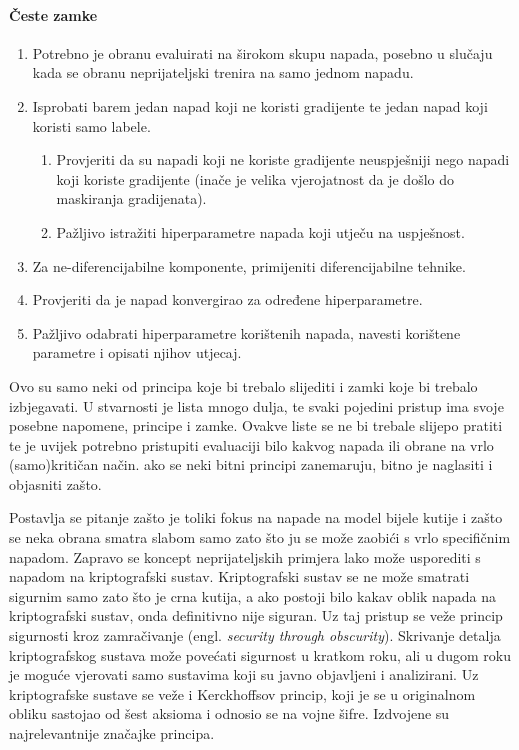 \documentclass[utf8, diplomski]{fer}
\begin{document}
\paragraph{Česte zamke}
\begin{enumerate}[noitemsep,topsep=0pt,parsep=0pt,partopsep=0pt]
	\item Potrebno je obranu evaluirati na širokom skupu napada, posebno u slučaju kada se obranu neprijateljski trenira na samo jednom napadu.
	\item Isprobati barem jedan napad koji ne koristi gradijente te jedan napad koji koristi samo labele.
	\begin{enumerate}[noitemsep,topsep=0pt,parsep=0pt,partopsep=0pt]
    	\item Provjeriti da su napadi koji ne koriste gradijente neuspješniji nego napadi koji koriste gradijente (inače je velika vjerojatnost da je došlo do maskiranja gradijenata).
    	\item Pažljivo istražiti hiperparametre napada koji utječu na uspješnost.
    \end{enumerate}
    \item Za ne-diferencijabilne komponente, primijeniti diferencijabilne tehnike.
    \item Provjeriti da je napad konvergirao za određene hiperparametre.
    \item Pažljivo odabrati hiperparametre korištenih napada, navesti korištene parametre i opisati njihov utjecaj.
\end{enumerate}
\medskip
\par
Ovo su samo neki od principa koje bi trebalo slijediti i zamki koje bi trebalo izbjegavati. U stvarnosti je lista mnogo dulja, te svaki pojedini pristup ima svoje posebne napomene, principe i zamke. Ovakve liste se ne bi trebale slijepo pratiti te je uvijek potrebno pristupiti evaluaciji bilo kakvog napada ili obrane na vrlo (samo)kritičan način. ako se neki bitni principi zanemaruju, bitno je naglasiti i objasniti zašto. 
\par
Postavlja se pitanje zašto je toliki fokus na napade na model bijele kutije i zašto se neka obrana smatra slabom samo zato što ju se može zaobići s vrlo specifičnim napadom. Zapravo se koncept neprijateljskih primjera lako može usporediti s napadom na kriptografski sustav. Kriptografski sustav se ne može smatrati sigurnim samo zato što je crna kutija, a ako postoji bilo kakav oblik napada na kriptografski sustav, onda definitivno nije siguran. Uz taj pristup se veže princip sigurnosti kroz zamračivanje (engl. \textit{security through obscurity}). Skrivanje detalja kriptografskog sustava može povećati sigurnost u kratkom roku, ali u dugom roku je moguće vjerovati samo sustavima koji su javno objavljeni i analizirani. Uz kriptografske sustave se veže i Kerckhoffsov princip, koji je se u originalnom obliku sastojao od šest aksioma i odnosio se na vojne šifre. Izdvojene su najrelevantnije značajke principa.
\end{document}
